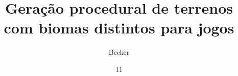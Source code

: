 \documentclass[tg]{mdtuffs}
\title{Geração procedural de terrenos com biomas distintos para jogos}
\author{Becker}{João Carlos}
\institute{Ciência da Computação}
\date{11}{Dezembro}{2017}
\begin{document}
\maketitle




\makeapprove





\end{document}
